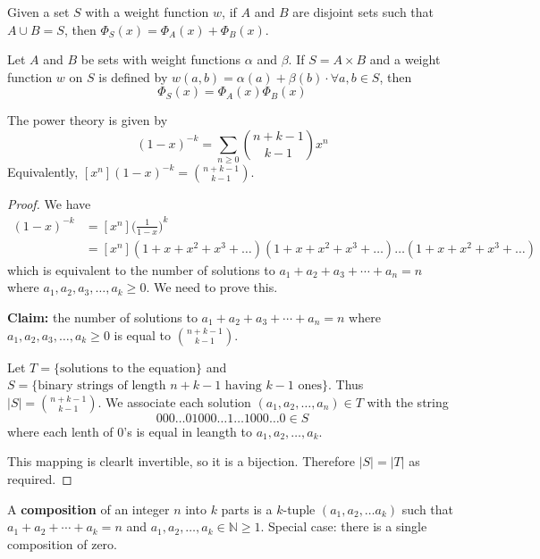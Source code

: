 \documentclass[12pt]{article}
\begin{document}
\begin{lemma}
Given a set $S$ with a weight function $w$, if $A$ and $B$ are disjoint sets such that $A \cup B = S$, then $\Phi_S (x) = \Phi_A (x) + \Phi_B (x)$.
\end{lemma}

\begin{lemma}
Let $A$ and $B$ be sets with weight functions $\alpha$ and $\beta$. If $S = A \times B$ and a weight function $w$ on $S$ is defined by $w(a,b) = \alpha(a) + \beta(b) \cdot \forall a,b \in S$, then \[ \Phi_S (x) = \Phi_A (x) \Phi_B (x) \]
\end{lemma}

\begin{theorem}
The power theory is given by \[ {(1-x)}^{-k} = \sum_{n\geq 0} {n + k - 1 \choose k - 1} x^n \] Equivalently, $[x^n]{(1-x)}^{-k} = {n+k-1 \choose k-1}$.
\end{theorem}

\begin{proof}
We have
\begin{align*}
[x^n]{(1-x)}^{-k} &= [x^n]{\bigg(\frac{1}{1-x}\bigg)}^k\\
&= [x^n](1+x+x^2+x^3+\dots)(1+x+x^2+x^3+\dots)\dots(1+x+x^2+x^3+\dots)
\end{align*}
which is equivalent to the number of solutions to $a_1 + a_2 + a_3 + \cdots + a_n = n$ where $a_1, a_2, a_3, \dots, a_k \geq 0$. We need to prove this.

{\bf Claim:} the number of solutions to $a_1 + a_2 + a_3 + \cdots + a_n = n$ where $a_1, a_2, a_3, \dots, a_k \geq 0$ is equal to ${n+k-1 \choose k-1}$.

Let $T = \{\text{solutions to the equation}\}$ and $S = \{\text{binary strings of length }n+k-1 \text{ having }k-1\text{ ones}\}$. Thus $|S| = {n+k-1 \choose k-1}$. We associate each solution $(a_1, a_2, \dots, a_n) \in T$ with the string \[ 000\dots 01000\dots 1\dots 1000\dots 0 \in S \] where each lenth of $0$'s is equal in leangth to $a_1, a_2, \dots, a_k$.

This mapping is clearlt invertible, so it is a bijection. Therefore $|S| = |T|$ as required.
\end{proof}

A {\bf composition} of an integer $n$ into $k$ parts is a $k$-tuple $(a_1,a_2,\dots a_k)$ such that $a_1 + a_2 + \cdots + a_k = n$ and $a_1, a_2, \dots, a_k \in \mathbb{N} \geq 1$. Special case: there is a single composition of zero.
\end{document}
